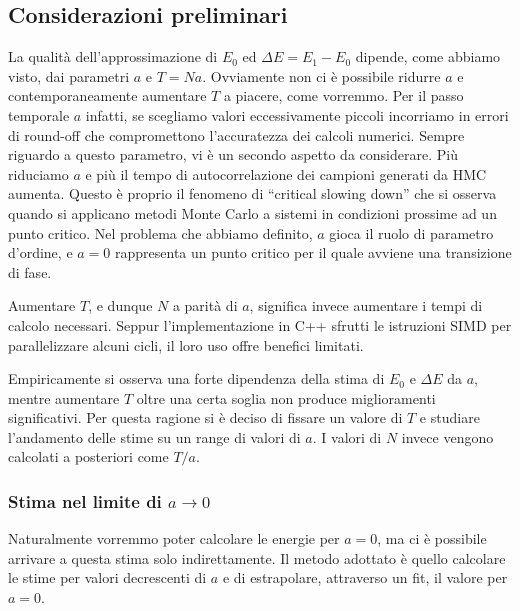 \documentclass[11pt, a4paper]{article}
\begin{document}
\subsection{Considerazioni preliminari}
La qualità dell'approssimazione di $E_0$ ed $\Delta E = E_1 - E_0$ dipende, come abbiamo visto, dai parametri $a$ e $T = N a$.
Ovviamente non ci è possibile ridurre $a$ e contemporaneamente aumentare $T$ a piacere, come vorremmo.
Per il passo temporale $a$ infatti, se scegliamo valori eccessivamente piccoli incorriamo in errori di round-off che compromettono l'accuratezza dei calcoli numerici.
Sempre riguardo a questo parametro, vi è un secondo aspetto da considerare.
Più riduciamo $a$ e più il tempo di autocorrelazione dei campioni generati da HMC aumenta.
Questo è proprio il fenomeno di ``critical slowing down'' che si osserva quando si applicano metodi Monte Carlo a sistemi in condizioni prossime ad un punto critico.
Nel problema che abbiamo definito, $a$ gioca il ruolo di parametro d'ordine, e $a = 0$ rappresenta un punto critico per il quale avviene una transizione di fase.

Aumentare $T$, e dunque $N$ a parità di $a$, significa invece  aumentare i tempi di calcolo necessari. Seppur l'implementazione in C++ sfrutti le istruzioni SIMD per parallelizzare alcuni cicli, il loro uso offre benefici limitati.

Empiricamente si osserva una forte dipendenza della stima di $E_0$ e $\Delta E$ da $a$, mentre aumentare $T$ oltre una certa soglia non produce miglioramenti significativi.
Per questa ragione si è deciso di fissare un valore di $T$ e studiare l'andamento delle stime su un range di valori di $a$. I valori di $N$ invece vengono calcolati a posteriori come $T / a$.

\subsubsection{Stima nel limite di \texorpdfstring{$a \to 0$}{a -> 0}}

Naturalmente vorremmo poter calcolare le energie per $a = 0$, ma ci è possibile arrivare a questa stima solo indirettamente.
Il metodo adottato è quello calcolare le stime per valori decrescenti di $a$ e di estrapolare, attraverso un fit, il valore per $a = 0$.
\end{document}
